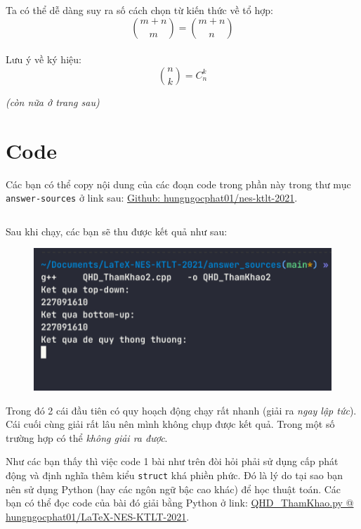 \documentclass[12pt]{article}
\begin{document}
Ta có thể dễ dàng suy ra số cách chọn từ kiến thức về tổ hợp:
$$
{m+n \choose m} = {m + n \choose n}
$$
\\[0.5cm]


Lưu ý về ký hiệu: 
$$
{n \choose k} = C_{n}^{k}
$$\bigskip 

\textit{(còn nữa ở trang sau)}
\pagebreak

\section{Code} \label{code}
Các bạn có thể copy nội dung của các đoạn code trong phần này trong thư mục \verb#answer-sources# ở link sau: \href{https://github.com/hungngocphat01/nes-ktlt-2021}{Github: hungngocphat01/nes-ktlt-2021}. \bigskip 

\inputminted[linenos,breaklines]{cpp}{answer_sources/QHD_ThamKhao2.cpp}

Sau khi chạy, các bạn sẽ thu được kết quả như sau:
\begin{figure}[H]
    \centering 
    \includegraphics[width=\textwidth]{image/qhd_run.png}
\end{figure}
Trong đó 2 cái đầu tiên có quy hoạch động chạy rất nhanh (giải ra \textit{ngay lập tức}). Cái cuối cùng giải rất lâu nên mình không chụp được kết quả. Trong một số trường hợp có thể \textit{không giải ra được}. \bigskip 

Như các bạn thấy thì việc code 1 bài như trên đòi hỏi phải sử dụng cấp phát động và định nghĩa thêm kiểu \verb#struct# khá phiền phức. Đó là lý do tại sao bạn nên sử dụng Python (hay các ngôn ngữ bậc cao khác) để học thuật toán. Các bạn có thể đọc code của bài đó giải bằng Python ở link: \href{https://github.com/hungngocphat01/LaTeX-NES-KTLT-2021/blob/main/answer_sources/QHD_ThamKhao.py}{QHD\_ThamKhao.py @ hungngocphat01/LaTeX-NES-KTLT-2021}. \bigskip 
\end{document}
